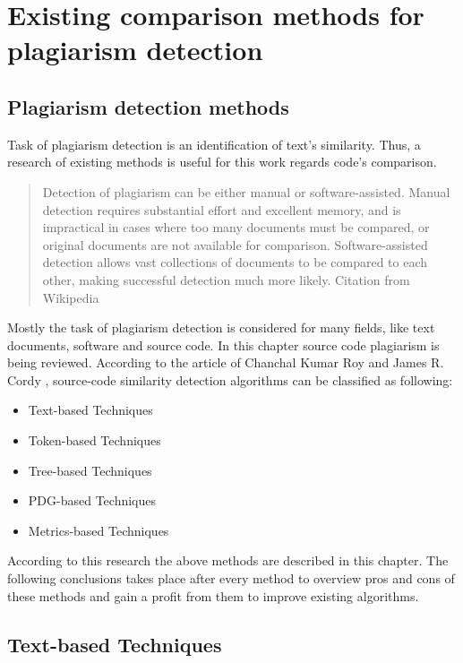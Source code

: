 \documentclass{report}
\begin{document}
\chapter{Existing comparison methods for plagiarism detection}
\section{Plagiarism detection methods}
\label{sec: plagiarism_methods}

Task of plagiarism detection is an identification of text's similarity. Thus, a research of existing methods is useful for this work regards code's comparison.
\begin{quote} Detection of plagiarism can be either manual or software-assisted. Manual detection requires substantial effort and excellent memory, and is impractical in cases where too many documents must be compared, or original documents are not available for comparison. Software-assisted detection allows vast collections of documents to be compared to each other, making successful detection much more likely. Citation from Wikipedia \end{quote}

\noindent
Mostly the task of plagiarism detection is considered for many fields, like text documents, software and source code. In this chapter source code plagiarism is being reviewed.
According to the article of Chanchal Kumar Roy and James R. Cordy \cite{software_clone_detection}, source-code similarity detection algorithms can be classified as following:
\begin{itemize}
	\item Text-based Techniques
	\item Token-based Techniques
	\item Tree-based Techniques
	\item PDG-based Techniques
	\item Metrics-based Techniques
\end{itemize}
According to this research the above methods are described in this chapter. The following conclusions takes place after every method to overview pros and cons of these methods and gain a profit from them to improve existing algorithms.

\section{Text-based Techniques}
\label{sec: text_tech}
\end{document}
